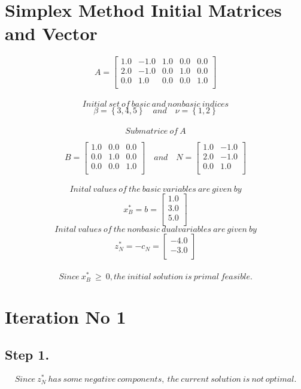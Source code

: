 \documentclass [12pt] {article}
\begin{document}
\section*{Simplex Method Initial Matrices and Vector} 
\[
A  =
\begin{bmatrix}
1.0 & -1.0 & 1.0 & 0.0 & 0.0 \\ 2.0 & -1.0 & 0.0 & 1.0 & 0.0 \\ 0.0 & 1.0 & 0.0 & 0.0 & 1.0 \\ 
\end{bmatrix}
\]
\\
\[ Initial\ set\  of\  basic\  and\  nonbasic\  indices \]
\[
\beta= \left\{3, 4, 5\right\} \quad and \quad  \nu=\left\{1, 2\right\}
\]
\\
\[
Submatrice\ of \ A
\]

\[
B =
\begin{bmatrix}
1.0 & 0.0 & 0.0 \\ 0.0 & 1.0 & 0.0 \\ 0.0 & 0.0 & 1.0 \\ 
\end{bmatrix} \quad and \quad
\mathit{N} =
\begin{bmatrix}
1.0 & -1.0 \\ 2.0 & -1.0 \\ 0.0 & 1.0 \\ 
\end{bmatrix}
\]
\\
\[
Inital\ values\ of\ the\ basic\ variables\ are\ given\ by
\]
\[
x_B^* = b =
\begin{bmatrix}
1.0 \\ 3.0 \\ 5.0 \\ 
\end{bmatrix}
\]
\[
Inital\ values\ of\ the\ nonbasic\ dual variables\ are\ given\ by
\]
\[
z_\mathit{N}^*= -c_\mathit{N} =
\begin{bmatrix}
-4.0 \\ -3.0 \\ 
\end{bmatrix}
\]
\\
\[
Since\ x_B^*\  \geq \  0, the\ initial\ solution\ is\ primal\ feasible.
\]
\section*{Iteration No 1}
\subsection{Step 1.}
\[
Since\ z_\mathit{N}^*\ has\ some\ negative\ components,\ the\ current\ solution\ is\ not\ optimal.
\]
\end{document}
